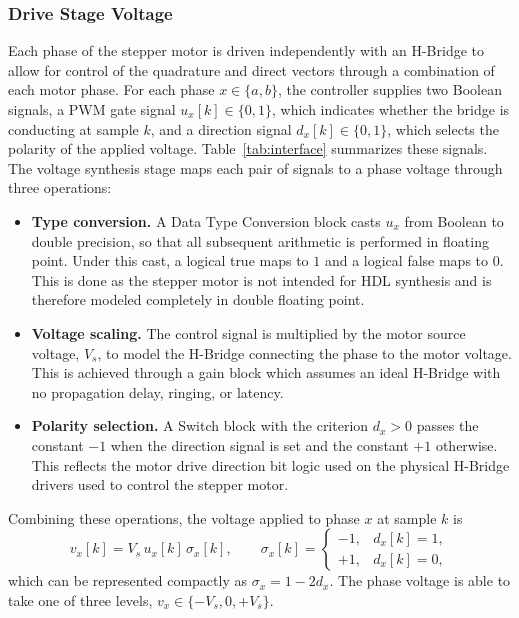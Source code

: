 \subsubsection{Drive Stage Voltage}

Each phase of the stepper motor is driven independently with an H-Bridge to allow for control of the quadrature and direct vectors through a combination of each motor phase. For each phase $x \in \{a, b\}$, the controller supplies two Boolean signals, a PWM gate signal $u_x[k] \in \{0, 1\}$, which indicates whether the bridge is conducting at sample $k$, and a direction signal $d_x[k] \in \{0, 1\}$, which selects the polarity of the applied voltage. Table~\ref{tab:interface} summarizes these signals. The voltage synthesis stage maps each pair of signals to a phase voltage through three operations:

\begin{itemize}
	\item \textbf{Type conversion.} A Data Type Conversion block casts $u_x$ from Boolean to double precision, so that all subsequent arithmetic is performed in floating point. Under this cast, a logical true maps to $1$ and a logical false maps to $0$. This is done as the stepper motor is not intended for HDL synthesis and is therefore modeled completely in double floating point. 
	
	\item \textbf{Voltage scaling.} The control signal is multiplied by the motor source voltage, $V_s$, to model the H-Bridge connecting the phase to the motor voltage. This is achieved through a gain block which assumes an ideal H-Bridge with no propagation delay, ringing, or latency. 
	
	\item \textbf{Polarity selection.} A Switch block with the criterion $d_x > 0$ passes the constant $-1$ when the direction signal is set and the constant $+1$ otherwise. This reflects the motor drive direction bit logic used on the physical H-Bridge drivers used to control the stepper motor. 
\end{itemize}

Combining these operations, the voltage applied to phase $x$ at sample $k$ is
\begin{equation}
	v_x[k] = V_s \, u_x[k] \, \sigma_x[k],
	\qquad
	\sigma_x[k] =
	\begin{cases}
		-1, & d_x[k] = 1, \\
		+1, & d_x[k] = 0,
	\end{cases}
	\label{eq:vsynth}
\end{equation}
which can be represented compactly as $\sigma_x = 1 - 2 d_x$. The phase voltage is able to take one of three levels, $v_x \in \{-V_s, 0, +V_s\}$.


